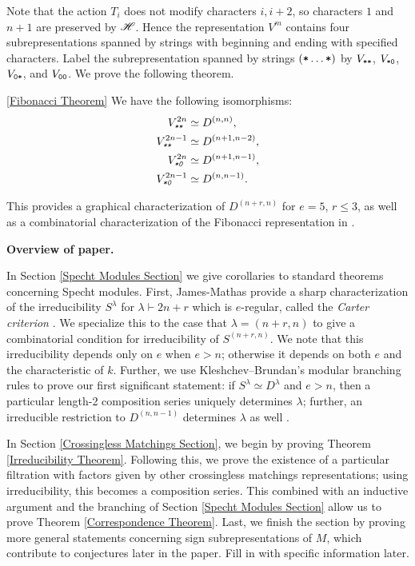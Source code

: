 \documentclass{amsart}
\def\thmcolor{black!60!orange}
\newcommand{\fakesubsection}[1]{
    \vspace{7pt}
    \noindent \textbf{#1.}
  }
\begin{document}
  Note that the action $T_i$ does not modify characters $i,i+2$, so characters $1$ and $n+1$ are preserved by $\mathscr{H}$.
  Hence the representation $V^m$ contains four subrepresentations spanned by strings with beginning and ending with specified characters.
  Label the subrepresentation spanned by strings $(\texttt{*}\dots\texttt{*})$ by $V_{\texttt{*}\texttt{*}}$, $V_{\texttt{*}\texttt{0}}$, $V_{\texttt{0}\texttt{*}}$, and $V_{\texttt{0}\texttt{0}}$.
  We prove the following theorem.
  \begingroup
  \hypersetup{linkcolor=\thmcolor}
  \begin{customthm}{\ref{Fibonacci Theorem}}
    We have the following isomorphisms:
    \begin{align*}  
      \emph{$V^{2n}_{\texttt{*}\texttt{*}}$} &\simeq D^{(n,n)},\\ 
      \emph{$V^{2n-1}_{\texttt{*}\texttt{*}}$} &\simeq D^{(n+1,n-2)},\\
      \emph{$V^{2n}_{\texttt{*}\texttt{0}}$} &\simeq D^{(n+1,n-1)},\\
      \emph{$V^{2n-1}_{\texttt{*}\texttt{0}}$} &\simeq D^{(n,n-1)}.
    \end{align*}
  \end{customthm}
  \endgroup
  This provides a graphical characterization of $D^{(n+r,n)}$ for $e = 5$, $r \leq 3$, as well as a combinatorial characterization of the Fibonacci representation in \cite{Shor}.

  \fakesubsection{Overview of paper}
  
  In Section \ref{Specht Modules Section} we give corollaries to standard theorems concerning Specht modules.
  First, James-Mathas provide a sharp characterization of the irreducibility $S^\lambda$ for $\lambda \vdash 2n + r$ which is $e$-regular, called the \emph{Carter criterion} \cite[Thm.~5.42]{Mathas-book}.
  We specialize this to the case that $\lambda = (n+r,n)$ to give a combinatorial condition for irreducibility of $S^{(n+r,n)}$.
  We note that this irreducibility depends only on $e$ when $e > n$;
  otherwise it depends on both $e$ and the characteristic of $k$.
  Further, we use Kleshchev--Brundan's modular branching rules to prove our first significant statement: if $S^\lambda \simeq D^\lambda$ and $e > n$, then a particular length-2 composition series uniquely determines $\lambda$;
  further, an irreducible restriction to $D^{(n,n-1)}$ determines $\lambda$ as well \cite{Kleshchev, Brundan}.

  \vspace{5pt}
  In Section \ref{Crossingless Matchings Section}, we begin by proving Theorem \ref{Irreducibility Theorem}.
  Following this, we prove the existence of a particular filtration with factors given by other crossingless matchings representations;
  using irreducibility, this becomes a composition series.
  This combined with an inductive argument and the branching of Section \ref{Specht Modules Section} allow us to prove Theorem \ref{Correspondence Theorem}.
  Last, we finish the section by proving more general statements concerning sign subrepresentations of $M$, which contribute to conjectures later in the paper.{\color{orange} Fill in with specific information later.}
\end{document}
